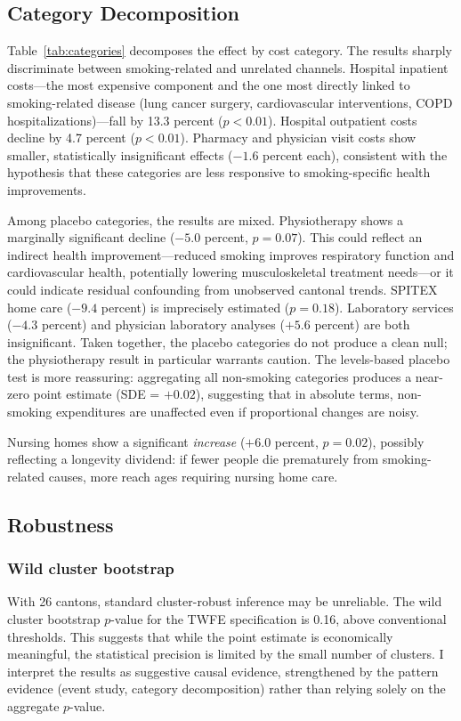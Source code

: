 \documentclass[12pt]{article}
\begin{document}
\subsection{Category Decomposition}



Table~\ref{tab:categories} decomposes the effect by cost category. The results sharply discriminate between smoking-related and unrelated channels. Hospital inpatient costs---the most expensive component and the one most directly linked to smoking-related disease (lung cancer surgery, cardiovascular interventions, COPD hospitalizations)---fall by 13.3 percent ($p < 0.01$). Hospital outpatient costs decline by 4.7 percent ($p < 0.01$). Pharmacy and physician visit costs show smaller, statistically insignificant effects ($-1.6$ percent each), consistent with the hypothesis that these categories are less responsive to smoking-specific health improvements.

Among placebo categories, the results are mixed. Physiotherapy shows a marginally significant decline ($-5.0$ percent, $p = 0.07$). This could reflect an indirect health improvement---reduced smoking improves respiratory function and cardiovascular health, potentially lowering musculoskeletal treatment needs---or it could indicate residual confounding from unobserved cantonal trends. SPITEX home care ($-9.4$ percent) is imprecisely estimated ($p = 0.18$). Laboratory services ($-4.3$ percent) and physician laboratory analyses ($+5.6$ percent) are both insignificant. Taken together, the placebo categories do not produce a clean null; the physiotherapy result in particular warrants caution. The levels-based placebo test is more reassuring: aggregating all non-smoking categories produces a near-zero point estimate (SDE = $+0.02$), suggesting that in absolute terms, non-smoking expenditures are unaffected even if proportional changes are noisy.

Nursing homes show a significant \textit{increase} ($+6.0$ percent, $p = 0.02$), possibly reflecting a longevity dividend: if fewer people die prematurely from smoking-related causes, more reach ages requiring nursing home care.

\subsection{Robustness}



\subsubsection*{Wild cluster bootstrap} With 26 cantons, standard cluster-robust inference may be unreliable. The wild cluster bootstrap $p$-value for the TWFE specification is 0.16, above conventional thresholds. This suggests that while the point estimate is economically meaningful, the statistical precision is limited by the small number of clusters. I interpret the results as suggestive causal evidence, strengthened by the pattern evidence (event study, category decomposition) rather than relying solely on the aggregate $p$-value.
\end{document}

